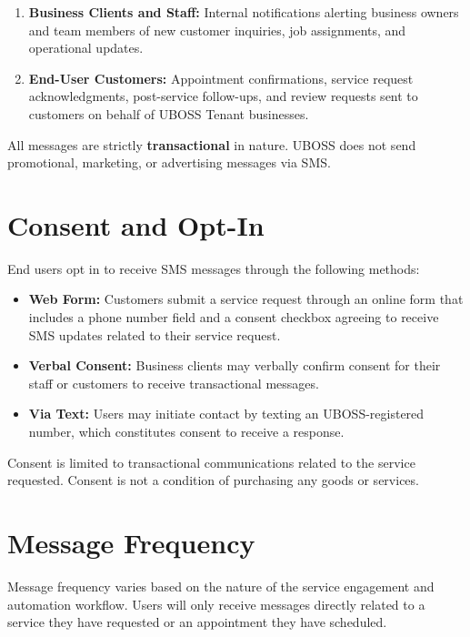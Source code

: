 \documentclass[11pt]{article}
\begin{document}
\begin{enumerate}[leftmargin=2em]
    \item \textbf{Business Clients and Staff:} Internal notifications alerting business owners and team members of new customer inquiries, job assignments, and operational updates.
    \item \textbf{End-User Customers:} Appointment confirmations, service request acknowledgments, post-service follow-ups, and review requests sent to customers on behalf of UBOSS Tenant businesses.
\end{enumerate}

All messages are strictly \textbf{transactional} in nature. UBOSS does not send promotional, marketing, or advertising messages via SMS.

\section{Consent and Opt-In}

End users opt in to receive SMS messages through the following methods:

\begin{itemize}[leftmargin=2em]
    \item \textbf{Web Form:} Customers submit a service request through an online form that includes a phone number field and a consent checkbox agreeing to receive SMS updates related to their service request.
    \item \textbf{Verbal Consent:} Business clients may verbally confirm consent for their staff or customers to receive transactional messages.
    \item \textbf{Via Text:} Users may initiate contact by texting an UBOSS-registered number, which constitutes consent to receive a response.
\end{itemize}

Consent is limited to transactional communications related to the service requested. Consent is not a condition of purchasing any goods or services.

\section{Message Frequency}

Message frequency varies based on the nature of the service engagement and automation workflow. Users will only receive messages directly related to a service they have requested or an appointment they have scheduled.
\end{document}
